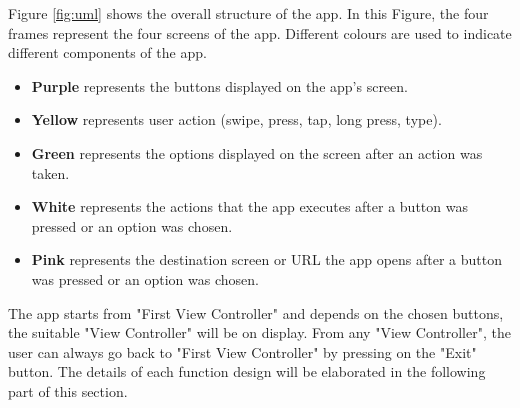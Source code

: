 Figure \ref{fig:uml} shows the overall structure of the app. In this Figure, the four frames represent the four screens of the app. Different colours are used to indicate different components of the app.
\begin{itemize}
\item \textbf{Purple} represents the buttons displayed on the app's screen.
\item \textbf{Yellow} represents user action (swipe, press, tap, long press, type).
\item \textbf{Green} represents the options displayed on the screen after an action was taken.
\item \textbf{White} represents the actions that the app executes after a button was pressed or an option was chosen.
\item \textbf{Pink} represents the destination screen or URL the app opens after a button was pressed or an option was chosen. 
\end{itemize}
The app starts from "First View Controller" and depends on the chosen buttons, the suitable "View Controller" will be on display. From any "View Controller", the user can always go back to "First View Controller" by pressing on the "Exit" button. The details of each function design will be elaborated in the following part of this section.

